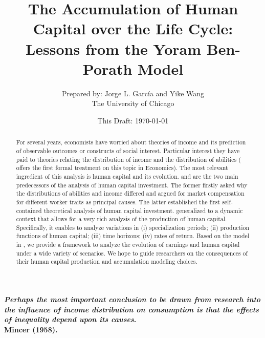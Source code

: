 \documentclass[12pt]{article}
\begin{document}
\title{The Accumulation of Human Capital over the Life Cycle: Lessons from the Yoram Ben-Porath Model}
\author{Prepared by: Jorge L. Garc\'{i}a and Yike Wang \\ The University of Chicago}
\date{This Draft: \today}
\maketitle

\begin{flushright}
\textbf{\textit{Perhaps the most important conclusion to be drawn from research into the influence of income distribution on consumption is that the effects of inequality depend upon its causes}.\\ Mincer (1958).}
\end{flushright}


\begin{abstract}
\noindent For several years, economists have worried about theories of income and its prediction of observable outcomes or constructs of social interest. Particular interest they have paid to theories relating the distribution of income and the distribution of abilities (\citet{staehle1943ability} offers the first formal treatment on this topic in Economics). The most relevant ingredient of this analysis is human capital and its evolution. \citet{mincer1958investment} and \citet{becker1962investment} are the two main predecessors of the analysis of human capital investment. The former firstly asked why the distributions of abilities and income differed and argued for market compensation for different worker traits as principal causes. The latter established the first self-contained theoretical analysis of human capital investment. \citet{ben1967production} generalized \citet{becker1962investment} to a dynamic context that allows for a very rich analysis of the production of human capital. Specifically, it enables to analyze variations in (i) specialization periods; (ii) production functions of human capital; (iii) time horizons; (iv) rates of return. Based on the model in \citet{ben1967production}, we provide a framework to analyze the evolution of earnings and human capital under a wide variety of scenarios. We hope to guide researchers on the consequences of their human capital production and accumulation modeling choices.
\end{abstract}



\clearpage


\end{document}
